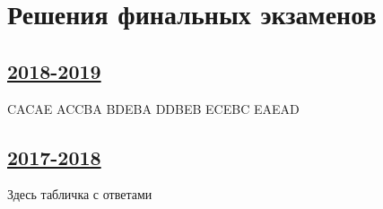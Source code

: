 \thispagestyle{empty}
\section{Решения финальных экзаменов}

\subsection[2018-2019]{\hyperref[sec:final_exam_2018_2019]{2018-2019}}
\label{sec:sol_final_exam_2018_2019}

CACAE ACCBA BDEBA DDBEB ECEBC EAEAD

\subsection[2017-2018]{\hyperref[sec:final_exam_2017_2018]{2017-2018}}
\label{sec:sol_final_exam_2017_2018}

Здесь табличка с ответами
